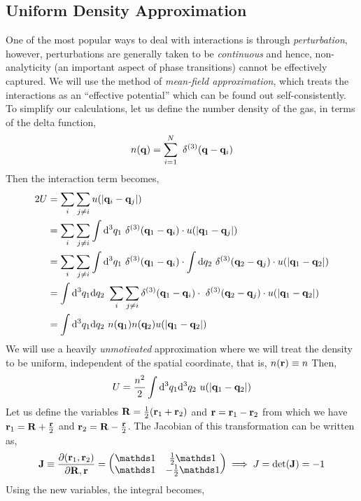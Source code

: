 \subsection{Uniform Density Approximation}
One of the most popular ways to deal with interactions is through \textit{perturbation}, however, perturbations are generally taken to be \textit{continuous} and hence, non-analyticity (an important aspect of phase transitions) cannot be effectively captured. We will use the method of \textit{mean-field approximation}, which treats the interactions as an ``effective potential'' which can be found out self-consistently. To simplify our calculations, let us define the number density of the gas, in terms of the delta function, 
\begin{equation}\label{eqn:density1}
    n(\vb{q}) = \sum\limits_{i=1}^N\ \delta^{(3)}(\vb{q}-\vb{q}_i)
\end{equation}
Then the interaction term becomes,
\begin{align*}
   2U &=\sum\limits_i\sum\limits_{j\neq i} u(\abs{\vb{q}_i-\vb{q}_j})\\
   &=\sum\limits_i\sum\limits_{j\neq i} \int\dd^3 q_1\ \delta^{(3)}(\vb{q}_1-\vb{q}_i)\cdot u(\abs{\vb{q}_1-\vb{q}_j})\\
   &=\sum\limits_i\sum\limits_{j\neq i} \int\dd^3 q_1\ \delta^{(3)}(\vb{q}_1-\vb{q}_i)\cdot \int\dd q_2 \ \delta^{(3)}(\vb{q}_2-\vb{q}_j)\cdot u(\abs{\vb{q}_1-\vb{q}_2})\\
   &=\int\dd^3 q_1\dd q_2\ \sum\limits_i\sum\limits_{j\neq i} \delta^{(3)}(\vb{q}_1-\vb{q}_i)\cdot  \ \delta^{(3)}(\vb{q}_2-\vb{q}_j)\cdot u(\abs{\vb{q}_1-\vb{q}_2})\\
   &=\int\dd^3 q_1\dd q_2\ n(\vb{q}_1)n(\vb{q}_2)u(\abs{\vb{q}_1-\vb{q}_2})
\end{align*}
We will use a heavily \textit{unmotivated} approximation where we will treat the density to be uniform, independent of the spatial coordinate, that is, $n(\vb{r})\equiv n$
Then, 
$$U = \frac{n^2}{2}\int\dd^3 q_1 \dd^3 q_2\ u(\abs{\vb{q}_1-\vb{q}_2})$$
Let us define the variables $\vb{R} = \frac{1}{2}(\vb{r}_1+\vb{r}_2)$ and $\vb{r} = \vb{r}_1-\vb{r}_2$ from which we have $\vb{r}_1 = \vb{R}+\frac{\vb{r}}{2}$ and $\vb{r}_2 = \vb{R}-\frac{\vb{r}}{2}$. The Jacobian of this transformation can be written as,
$$\mathrm{\vb{J}} \equiv \pdv{(\vb{r}_1, \vb{r}_2)}{\vb{R}, \vb{r}} =\mqty(\iden & \frac{1}{2}\iden\\ \iden & -\frac{1}{2}\iden) \implies J = \det({\mathrm{\vb{J}}}) = -1$$
Using the new variables, the integral becomes, 
